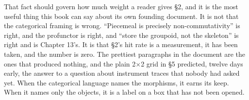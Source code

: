 That fact should govern how much weight a reader gives \S2, and it is the most useful thing this book can say about its own founding document. It is not that the categorical framing is wrong. ``Piecemeal is precisely non-commutativity'' is right, and the profunctor is right, and ``store the groupoid, not the skeleton'' is right and is Chapter 13's. It is that \S2's hit rate is a measurement, it has been taken, and the number is zero. The prettiest paragraphs in the document are the ones that produced nothing, and the plain 2$\times$2 grid in \S5 predicted, twelve days early, the answer to a question about instrument traces that nobody had asked yet. When the categorical language names the morphisms, it earns its keep. When it names only the objects, it is a label on a box that has not been opened.
